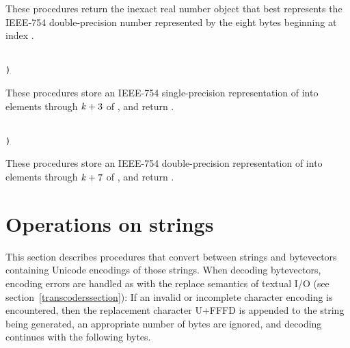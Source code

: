 \begin{entry}{%
}


These procedures return the inexact real number object that best
represents the IEEE-754 double-precision number represented by the
eight bytes beginning at index .
\end{entry}

\begin{entry}{%
}
{\tt\obeyspaces\\
       )}


These procedures store an IEEE-754 single-precision representation of  into
elements  through $\textnormal{\textit{k}}+3$ of , and return
\unspecifiedreturn.
\end{entry}

\begin{entry}{%
}
{\tt\obeyspaces\\
       )}


These procedures store an IEEE-754 double-precision representation of  into
elements  through $\textnormal{\textit{k}}+7$ of , and return
\unspecifiedreturn.
\end{entry}

\section{Operations on strings}

This section describes procedures that convert between strings and
bytevectors containing Unicode encodings of those strings.  When
decoding bytevectors, encoding errors are handled as with the {\cf
  replace} semantics of textual I/O (see
section~\ref{transcoderssection}): If an invalid or incomplete
character encoding is encountered, then the replacement character
U+FFFD is appended to the string being generated, an appropriate
number of bytes are ignored, and decoding continues with the following
bytes.

